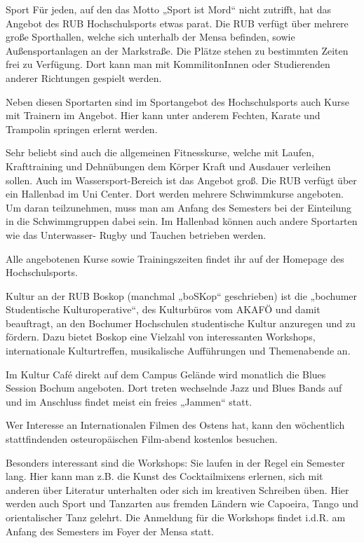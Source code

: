 Sport
Für jeden, auf den das Motto „Sport ist Mord“ nicht zutrifft, hat das Angebot des RUB Hochschulsports etwas parat. Die RUB verfügt über mehrere große Sporthallen, welche sich unterhalb der Mensa befinden, sowie Außensportanlagen an der Markstraße. Die Plätze stehen zu bestimmten Zeiten frei zu Verfügung. Dort kann man mit KommilitonInnen oder Studierenden anderer Richtungen gespielt werden.

Neben diesen Sportarten sind im Sportangebot des Hochschulsports auch Kurse mit Trainern im Angebot. Hier kann unter anderem Fechten, Karate und Trampolin springen erlernt werden.

Sehr beliebt sind auch die allgemeinen Fitnesskurse, welche mit Laufen, Krafttraining und Dehnübungen dem Körper Kraft und Ausdauer verleihen sollen. Auch im Wassersport-Bereich ist das Angebot groß. Die RUB verfügt über ein Hallenbad im Uni Center. Dort werden mehrere Schwimmkurse angeboten. Um daran teilzunehmen, muss man am Anfang des Semesters bei der Einteilung in die Schwimmgruppen dabei sein. Im Hallenbad können auch andere Sportarten wie das Unterwasser- Rugby und Tauchen betrieben werden.

Alle angebotenen Kurse sowie Trainingszeiten findet ihr auf der Homepage des Hochschulsports. 

Kultur an der RUB
Boskop (manchmal „boSKop“ geschrieben) ist die „bochumer Studentische Kulturoperative“, des Kulturbüros vom AKAFÖ und damit beauftragt, an den Bochumer Hochschulen studentische Kultur anzuregen und zu fördern. Dazu bietet Boskop eine Vielzahl von interessanten Workshops, internationale Kulturtreffen, musikalische Aufführungen und Themenabende an.

Im Kultur Café direkt auf dem Campus Gelände wird monatlich die Blues Session Bochum angeboten. Dort treten wechselnde Jazz und Blues Bands auf und im Anschluss findet meist ein freies „Jammen“ statt.

Wer Interesse an Internationalen Filmen des Ostens hat, kann den wöchentlich stattfindenden osteuropäischen Film-abend kostenlos besuchen.

Besonders interessant sind die Workshops: Sie laufen in der Regel ein Semester lang. Hier kann man z.B. die Kunst des Cocktailmixens erlernen, sich mit anderen über Literatur unterhalten oder sich im kreativen Schreiben üben. Hier werden auch Sport und Tanzarten aus fremden Ländern wie Capoeira, Tango und orientalischer Tanz gelehrt. Die Anmeldung für die Workshops findet i.d.R. am Anfang des Semesters im Foyer der Mensa statt.

